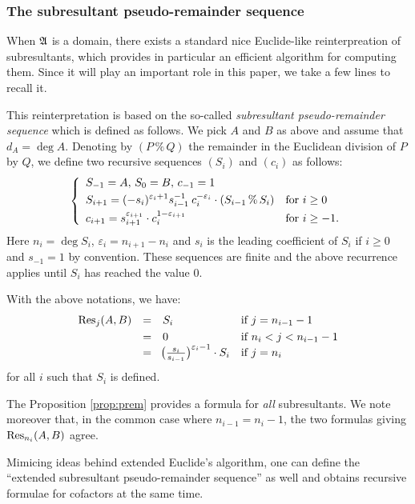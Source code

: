 \documentclass{article}
\begin{document}
\subsubsection*{The subresultant pseudo-remainder sequence}

When $\mathfrak A$ is a domain, there exists a standard nice Euclide-like
reinterpreation of subresultants, which provides in particular an 
efficient algorithm for computing them. Since it will play an important 
role in this paper, we take a few lines to recall it.

This reinterpretation is based on the so-called \emph{subresultant 
pseudo-remainder sequence} which is defined as follows. We pick $A$ and 
$B$ as above and assume that $d_A = \deg A$. Denoting by $(P \,\%\, Q)$ 
the remainder in the Euclidean division of $P$ by $Q$, we define two 
recursive sequences $(S_i)$ and $(c_i)$ as follows:
\begin{equation}
\label{eq:subressequence}
\left\{\begin{array}{ll}
S_{-1} = A, \, S_0 = B, \, c_{-1} = 1 \smallskip \\
\displaystyle S_{i+1} = (-s_i)^{\varepsilon_i + 1}
s_{i-1}^{-1} \: c_i^{-\varepsilon_i} \cdot (S_{i-1} \,\%\, S_i)
& \text{for } i \geq 0 \smallskip \\
\displaystyle c_{i+1} = s_{i+1}^{\varepsilon_{i+1}} \cdot c_i^{1-\varepsilon_{i+1}}
& \text{for } i \geq -1. 
\end{array}\right.
\end{equation}
Here $n_i = \deg S_i$, $\varepsilon_i = n_{i+1} - n_i$ and $s_i$ is the 
leading coefficient of $S_i$ if $i \geq 0$ and $s_{-1} = 1$ by 
convention. These sequences are finite and the above recurrence applies 
until $S_i$ has reached the value $0$.

\begin{prop}
\label{prop:prem}
With the above notations, we have:
$$\begin{array}{rcll}
\Res_j(A,B) & = & S_i & \text{if } j = n_{i-1} - 1 \smallskip \\
& = & 0 & \text{if } n_i < j < n_{i-1} - 1 \\
& = & \!\big(\frac{s_i}{s_{i-1}}\big)^{\varepsilon_i-1} \cdot S_i & 
\text{if } j = n_i
\end{array}$$
for all $i$ such that $S_i$ is defined.
\end{prop}

\begin{rem}
The Proposition \ref{prop:prem} provides a formula for \emph{all} 
subresultants. We note moreover that, in the common case where $n_{i-1} 
= n_i - 1$, the two formulas giving $\text{\rm Res}_{n_i}(A,B)$ agree.

Mimicing ideas behind extended Euclide's algorithm, one can define the 
``extended subresultant pseudo-remainder sequence'' as well and obtains
recursive formulae for cofactors at the same time.
\end{rem}
\end{document}
